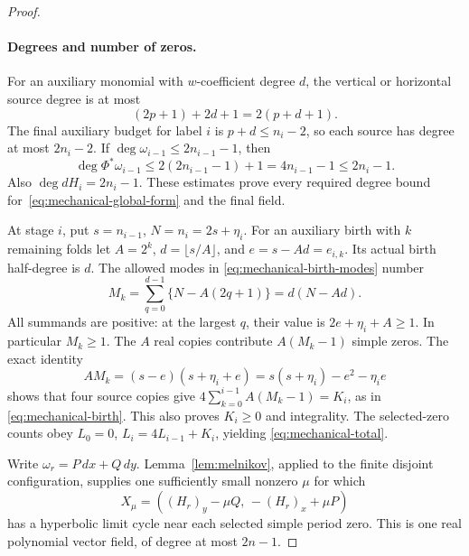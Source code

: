 \begin{proof}
\paragraph{Degrees and number of zeros.}
For an auxiliary monomial with $w$-coefficient degree $d$, the vertical
or horizontal source degree is at most
\[
 (2p+1)+2d+1=2(p+d+1).
\]
The final auxiliary budget for label $i$ is $p+d\leq n_i-2$, so each
source has degree at most $2n_i-2$.  If
$\deg\omega_{i-1}\leq2n_{i-1}-1$, then
\[
 \deg\Phi^*\omega_{i-1}
 \leq2(2n_{i-1}-1)+1
 =4n_{i-1}-1\leq2n_i-1.
\]
Also $\deg dH_i=2n_i-1$.  These estimates prove every required degree
bound for~\eqref{eq:mechanical-global-form} and the final field.

At stage $i$, put $s=n_{i-1}$, $N=n_i=2s+\eta_i$. For an auxiliary
birth with $k$ remaining folds let $A=2^k$,
$d=\lfloor s/A\rfloor$, and $e=s-Ad=e_{i,k}$.  Its actual birth
half-degree is $d$.  The allowed modes in
\eqref{eq:mechanical-birth-modes} number
\[
 M_k=\sum_{q=0}^{d-1}\{N-A(2q+1)\}
     =d(N-Ad).
\]
All summands are positive: at the largest $q$, their value is
$2e+\eta_i+A\geq1$.  In particular $M_k\geq1$.  The $A$ real
copies contribute $A(M_k-1)$ simple zeros.  The exact identity
\[
 A M_k=(s-e)(s+\eta_i+e)
       =s(s+\eta_i)-e^2-\eta_i e
\]
shows that four source copies give
$4\sum_{k=0}^{i-1}A(M_k-1)=K_i$, as in
\eqref{eq:mechanical-birth}.  This also proves $K_i\geq0$ and
integrality. The selected-zero counts obey
$L_0=0$, $L_i=4L_{i-1}+K_i$, yielding
\eqref{eq:mechanical-total}.

Write $\omega_r=P\,dx+Q\,dy$.  Lemma~\ref{lem:melnikov}, applied to
the finite disjoint configuration, supplies one sufficiently small
nonzero $\mu$ for which
\[
 X_\mu=( (H_r)_y-\mu Q,\,-(H_r)_x+\mu P )
\]
has a hyperbolic limit cycle near each selected simple period zero.
This is one real polynomial vector field, of degree at most $2n-1$.
\end{proof}

